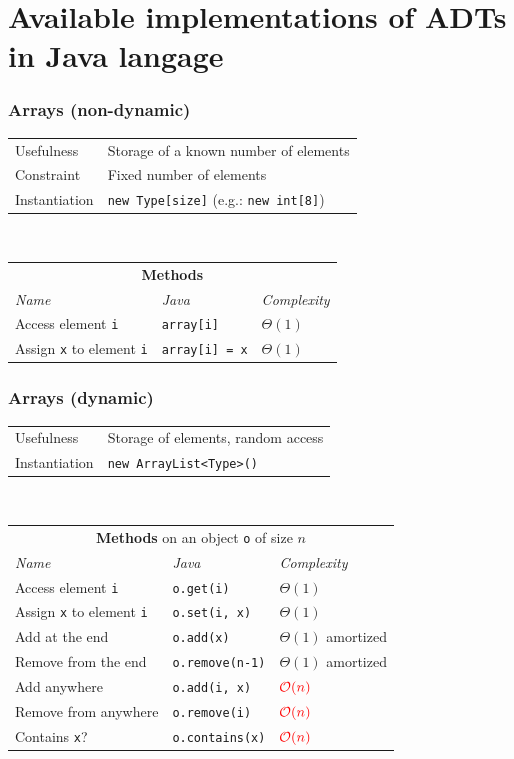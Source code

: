 \documentclass[8pt,aspectratio=169]{beamer}
\begin{document}
\section{Available implementations of ADTs in Java langage}


\begin{frame}
\frametitle{Arrays (non-dynamic)}
\centering
\begin{tabular}{lll}
	Usefulness & \multicolumn{2}{l}{Storage of a known number of elements}\\
	Constraint & \multicolumn{2}{l}{Fixed number of elements}\\
	Instantiation & \multicolumn{2}{l}{\texttt{new Type[size]} (e.g.: \texttt{new int[8]})}\\
\end{tabular}\\
\vspace{0.5cm}
\centering
\begin{tabular}{lll}
	\multicolumn{3}{c}{\textbf{Methods}} \\
	\textit{Name} & \textit{Java} & \textit{Complexity} \\
	Access element \texttt{i} & \texttt{array[i]} & $\Theta(1)$\\
	Assign \texttt{x} to element \texttt{i} & \texttt{array[i] = x} & $\Theta(1)$\\
\end{tabular}
\end{frame}

\begin{frame}
\frametitle{Arrays (dynamic)}
\centering
\begin{tabular}{ll}
	Usefulness & Storage of elements, random access\\
	Instantiation & \texttt{new ArrayList<Type>()}\\
\end{tabular}\\
\vspace{0.5cm}
\centering
\begin{tabular}{lll}
	\multicolumn{3}{c}{\textbf{Methods} on an object \texttt{o} of size $n$} \\
	\textit{Name} & \textit{Java} & \textit{Complexity} \\
	Access element \texttt{i} & \texttt{o.get(i)} & $\Theta(1)$\\
	Assign \texttt{x} to element \texttt{i} & \texttt{o.set(i, x)} & $\Theta(1)$\\
	Add at the end & \texttt{o.add(x)} & $\Theta(1)$ \color{orange}amortized\\
	Remove from the end & \texttt{o.remove(n-1)} & $\Theta(1)$ \color{orange}amortized\\
	Add anywhere & \texttt{o.add(i, x)} & $\color{red}\mathcal{O}(n)$\\
	Remove from anywhere & \texttt{o.remove(i)} & $\color{red}\mathcal{O}(n)$\\
	Contains \texttt{x}? & \texttt{o.contains(x)} & $\color{red}\mathcal{O}(n)$\\
\end{tabular}
\end{frame}
\end{document}
